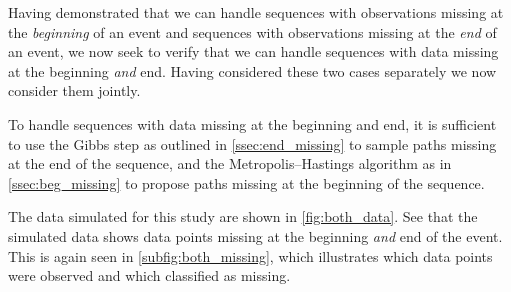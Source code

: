 Having demonstrated that we can handle sequences with observations missing at
the \emph{beginning} of an event and sequences with observations missing at the
\emph{end} of an event, we now seek to verify that we can handle sequences with
data missing at the beginning \emph{and} end. Having considered these two cases
separately we now consider them jointly. 

To handle sequences with data missing at the beginning and end, it is
sufficient to use the Gibbs step as outlined in \cref{ssec:end_missing} to
sample paths missing at the end of the sequence, and the Metropolis--Hastings
algorithm as in \cref{ssec:beg_missing} to propose paths missing at the
beginning of the sequence.

The data simulated for this study are shown in \cref{fig:both_data}. See that
the simulated data shows data points missing at the beginning \emph{and} end of
the event. This is again seen in \ref{subfig:both_missing}, which illustrates
which data points were observed and which classified as missing.

